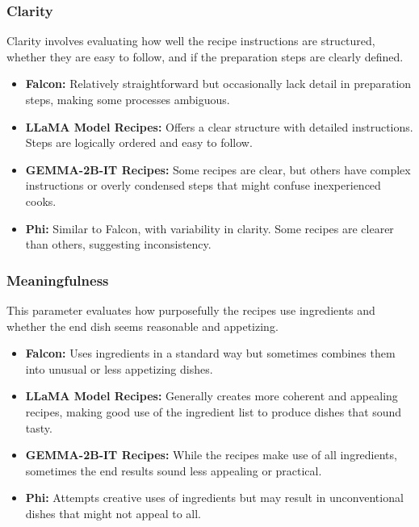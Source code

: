 \documentclass[letterpaper,11pt]{report}
\begin{document}
\subsubsection{Clarity}
Clarity involves evaluating how well the recipe instructions are structured, whether they are easy to follow, and if the preparation steps are clearly defined.
\begin{itemize}
    \item \textbf{Falcon:} Relatively straightforward but occasionally lack detail in preparation steps, making some processes ambiguous.
    \item \textbf{LLaMA Model Recipes:} Offers a clear structure with detailed instructions. Steps are logically ordered and easy to follow.
    \item \textbf{GEMMA-2B-IT Recipes:} Some recipes are clear, but others have complex instructions or overly condensed steps that might confuse inexperienced cooks.
    \item \textbf{Phi:} Similar to Falcon, with variability in clarity. Some recipes are clearer than others, suggesting inconsistency.
\end{itemize}

\subsubsection{Meaningfulness}
This parameter evaluates how purposefully the recipes use ingredients and whether the end dish seems reasonable and appetizing.
\begin{itemize}
    \item \textbf{Falcon:} Uses ingredients in a standard way but sometimes combines them into unusual or less appetizing dishes.
    \item \textbf{LLaMA Model Recipes:} Generally creates more coherent and appealing recipes, making good use of the ingredient list to produce dishes that sound tasty.
    \item \textbf{GEMMA-2B-IT Recipes:} While the recipes make use of all ingredients, sometimes the end results sound less appealing or practical.
    \item \textbf{Phi:} Attempts creative uses of ingredients but may result in unconventional dishes that might not appeal to all.
\end{itemize}
\end{document}
